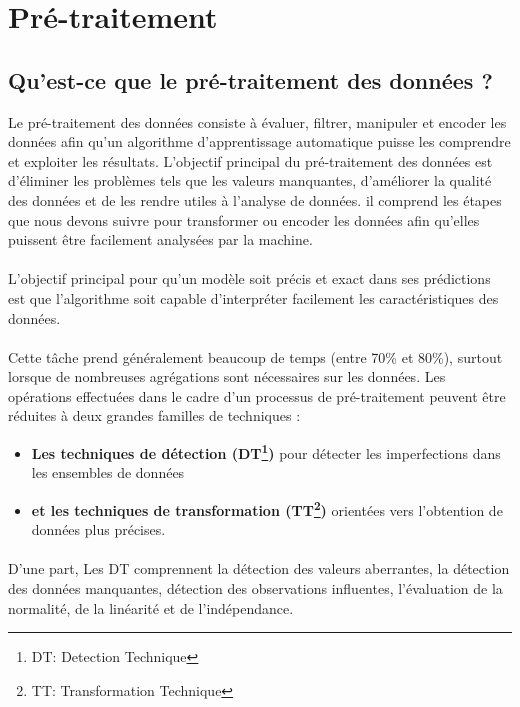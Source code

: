 \documentclass[a4paper, 12pt]{article}
\begin{document}
	\section{Pré-traitement}
	\subsection{Qu’est-ce que le pré-traitement des données ?}Le pré-traitement des données consiste à évaluer, filtrer, manipuler et encoder les données afin qu'un algorithme d'apprentissage automatique puisse les comprendre et exploiter les résultats. L'objectif principal du pré-traitement des données est d'éliminer les problèmes tels que les valeurs manquantes, d'améliorer la qualité des données et de les rendre utiles à l’analyse de données. il comprend les étapes que nous devons suivre pour transformer ou encoder les données afin qu'elles puissent être facilement analysées par la machine. 
	\paragraph{}L’objectif principal pour qu’un modèle soit précis et exact dans ses prédictions est que l’algorithme soit capable d’interpréter facilement les caractéristiques des données. 
	\paragraph{}
	Cette tâche prend généralement beaucoup de temps (entre 70\% et 80\%), surtout lorsque de nombreuses agrégations sont nécessaires sur les données. Les opérations effectuées dans le cadre d'un processus de pré-traitement peuvent être réduites à deux grandes familles de techniques :
	\begin{itemize}
		\item \textbf{Les techniques de détection (DT\footnote{DT: Detection Technique})} pour détecter les imperfections dans les ensembles de données 
		\item \textbf{et les techniques de transformation (TT\footnote{TT: Transformation Technique})} orientées vers l'obtention de données plus précises.
	\end{itemize}
	\paragraph{}D’une part, Les DT comprennent la détection des valeurs aberrantes, la détection des données manquantes, détection des observations influentes, l'évaluation de la normalité, de la linéarité et de l'indépendance. 
\end{document}
